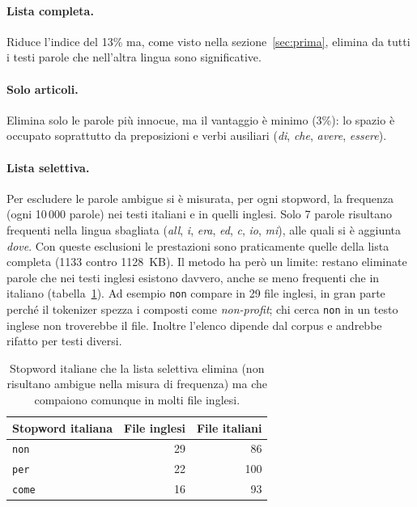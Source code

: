\documentclass[11pt,a4paper]{article}
\newcommand{\code}[1]{\texttt{#1}}
\begin{document}
\paragraph{Lista completa.} Riduce l'indice del 13\% ma, come visto nella
sezione~\ref{sec:prima}, elimina da tutti i testi parole che nell'altra lingua sono
significative.

\paragraph{Solo articoli.} Elimina solo le parole più innocue, ma il vantaggio è
minimo (3\%): lo spazio è occupato soprattutto da preposizioni e verbi ausiliari
(\emph{di}, \emph{che}, \emph{avere}, \emph{essere}).

\paragraph{Lista selettiva.} Per escludere le parole ambigue si è misurata, per ogni
stopword, la frequenza (ogni 10\,000 parole) nei testi italiani e in quelli inglesi.
Solo 7 parole risultano frequenti nella lingua sbagliata (\emph{all}, \emph{i},
\emph{era}, \emph{ed}, \emph{c}, \emph{io}, \emph{mi}), alle quali si è aggiunta
\emph{dove}. Con queste esclusioni le prestazioni sono praticamente quelle della
lista completa (1133 contro 1128~KB). Il metodo ha però un limite: restano
eliminate parole che nei testi inglesi esistono davvero, anche se meno frequenti
che in italiano (tabella~\ref{tab:ambigue}). Ad esempio \code{non} compare in 29 file
inglesi, in gran parte perché il tokenizer spezza i composti come \emph{non-profit};
chi cerca \code{non} in un testo inglese non troverebbe il file. Inoltre l'elenco
dipende dal corpus e andrebbe rifatto per testi diversi.

\begin{table}[!htbp]
\centering
\begin{tabular}{@{}lrr@{}}
\toprule
\textbf{Stopword italiana} & \textbf{File inglesi} & \textbf{File italiani} \\
\midrule
\code{non}  & 29 &  86 \\
\code{per}  & 22 & 100 \\
\code{come} & 16 &  93 \\
\bottomrule
\end{tabular}
\caption{Stopword italiane che la lista selettiva elimina (non risultano ambigue
nella misura di frequenza) ma che compaiono comunque in molti file inglesi.}
\label{tab:ambigue}
\end{table}
\end{document}
